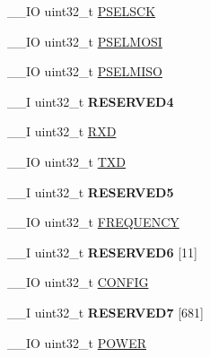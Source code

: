 \begin{DoxyCompactItemize}
\item 
\+\_\+\+\_\+\+I\+O uint32\+\_\+t \hyperlink{struct_n_r_f___s_p_i___type_a74122b695fda8dfd099e67ee0e215391}{P\+S\+E\+L\+S\+C\+K}
\item 
\+\_\+\+\_\+\+I\+O uint32\+\_\+t \hyperlink{struct_n_r_f___s_p_i___type_a24c15c1ef330e7ce489f9fd004e16445}{P\+S\+E\+L\+M\+O\+S\+I}
\item 
\+\_\+\+\_\+\+I\+O uint32\+\_\+t \hyperlink{struct_n_r_f___s_p_i___type_af83266ccac905744cc594822f2d35e94}{P\+S\+E\+L\+M\+I\+S\+O}
\item 
\hypertarget{struct_n_r_f___s_p_i___type_a22b9453caf4a2ec6674a7b79d9d8e97d}{}\+\_\+\+\_\+\+I uint32\+\_\+t {\bfseries R\+E\+S\+E\+R\+V\+E\+D4}\label{struct_n_r_f___s_p_i___type_a22b9453caf4a2ec6674a7b79d9d8e97d}

\item 
\+\_\+\+\_\+\+I uint32\+\_\+t \hyperlink{struct_n_r_f___s_p_i___type_ab4b135ec077f4588b01a99089377e5d4}{R\+X\+D}
\item 
\+\_\+\+\_\+\+I\+O uint32\+\_\+t \hyperlink{struct_n_r_f___s_p_i___type_abbdfd2eafab6da6953a94d309a1064e3}{T\+X\+D}
\item 
\hypertarget{struct_n_r_f___s_p_i___type_a6facce8b0e2c788cbce6d14569aca7a2}{}\+\_\+\+\_\+\+I uint32\+\_\+t {\bfseries R\+E\+S\+E\+R\+V\+E\+D5}\label{struct_n_r_f___s_p_i___type_a6facce8b0e2c788cbce6d14569aca7a2}

\item 
\+\_\+\+\_\+\+I\+O uint32\+\_\+t \hyperlink{struct_n_r_f___s_p_i___type_afb72da889110a95a53ab112a4d86d705}{F\+R\+E\+Q\+U\+E\+N\+C\+Y}
\item 
\hypertarget{struct_n_r_f___s_p_i___type_adb69167efd86bb24c0b236d79bb1569b}{}\+\_\+\+\_\+\+I uint32\+\_\+t {\bfseries R\+E\+S\+E\+R\+V\+E\+D6} \mbox{[}11\mbox{]}\label{struct_n_r_f___s_p_i___type_adb69167efd86bb24c0b236d79bb1569b}

\item 
\+\_\+\+\_\+\+I\+O uint32\+\_\+t \hyperlink{struct_n_r_f___s_p_i___type_a1254bb6ef0dfa8579e657ed339833242}{C\+O\+N\+F\+I\+G}
\item 
\hypertarget{struct_n_r_f___s_p_i___type_a5c43ac0fd8d9c37c117198abd001ea58}{}\+\_\+\+\_\+\+I uint32\+\_\+t {\bfseries R\+E\+S\+E\+R\+V\+E\+D7} \mbox{[}681\mbox{]}\label{struct_n_r_f___s_p_i___type_a5c43ac0fd8d9c37c117198abd001ea58}

\item 
\+\_\+\+\_\+\+I\+O uint32\+\_\+t \hyperlink{struct_n_r_f___s_p_i___type_abef5dca3ddc3feb25d58e96b6848d828}{P\+O\+W\+E\+R}
\end{DoxyCompactItemize}


